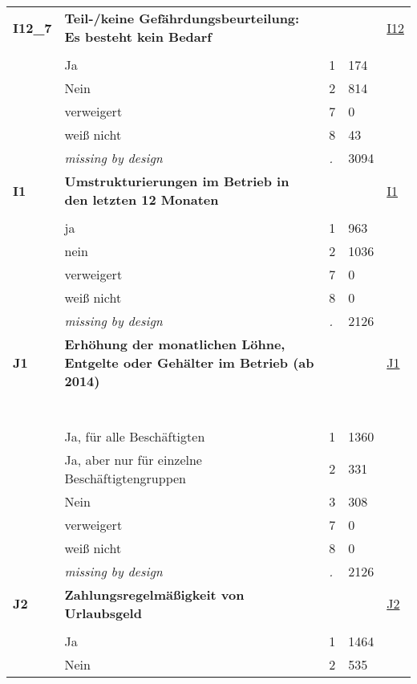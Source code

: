 \begin{longtable}{| L{2.65cm} | L{8cm} | C{1.5cm} | R{1.25cm} | C{2.25cm}  |}
   \midrule
\textbf{I12\_7}\label{var:I12:7} & \textbf{Teil-/keine Gefährdungsbeurteilung: Es besteht kein Bedarf} &  &  & \hyperref[I12]{I12} \\ 
   &  &  &  &  \\ 
   & Ja & 1 & 174 &  \\ 
   & Nein & 2 & 814 &  \\ 
   & verweigert & 7 & 0 &  \\ 
   & weiß nicht & 8 & 43 &  \\ 
   & \textit{missing by design} & \textit{.} & 3094 &  \\ 
   \midrule
\textbf{I1}\label{var:I1} & \textbf{Umstrukturierungen im Betrieb in den letzten 12 Monaten} &  &  & \hyperref[I1]{I1} \\ 
   &  &  &  &  \\ 
   & ja & 1 & 963 &  \\ 
   & nein & 2 & 1036 &  \\ 
   & verweigert & 7 & 0 &  \\ 
   & weiß nicht & 8 & 0 &  \\ 
   & \textit{missing by design} & \textit{.} & 2126 &  \\ 
   \midrule
\textbf{J1}\label{var:J1} & \textbf{Erhöhung der monatlichen Löhne, Entgelte oder Gehälter im Betrieb (ab 2014)} &  &  & \hyperref[J1]{J1} \\ 
   & \protect\subsection[Variablen J1 bis K6]{} &  &  &  \\ 
   & Ja, für alle Beschäftigten & 1 & 1360 &  \\ 
   & Ja, aber nur für einzelne Beschäftigtengruppen & 2 & 331 &  \\ 
   & Nein & 3 & 308 &  \\ 
   & verweigert & 7 & 0 &  \\ 
   & weiß nicht & 8 & 0 &  \\ 
   & \textit{missing by design} & \textit{.} & 2126 &  \\ 
   \midrule
\textbf{J2}\label{var:J2} & \textbf{Zahlungsregelmäßigkeit von Urlaubsgeld} &  &  & \hyperref[J2]{J2} \\ 
   &  &  &  &  \\ 
   & Ja & 1 & 1464 &  \\ 
   & Nein & 2 & 535 &  \\ 

\end{longtable}
